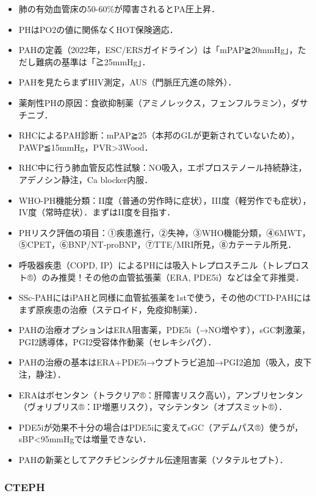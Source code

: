 \begin{itemize}
\item 肺の有効血管床の50-60\%が障害されるとPA圧上昇．
\item PHはPO2の値に関係なくHOT保険適応．
\item PAHの定義（2022年，ESC/ERSガイドライン）は「mPAP≧20mmHg」，ただし難病の基準は「≧25mmHg」．
\item PAHを見たらまずHIV測定，AUS（門脈圧亢進の除外）．
\item 薬剤性PHの原因：食欲抑制薬（アミノレックス，フェンフルラミン），ダサチニブ．
\item RHCによるPAH診断：mPAP≧25（本邦のGLが更新されていないため），PAWP≦15mmHg，PVR>3Wood．
\item RHC中に行う肺血管反応性試験：NO吸入，エポプロステノール持続静注，アデノシン静注，Ca blocker内服．
\item WHO-PH機能分類：II度（普通の労作時に症状），III度（軽労作でも症状），IV度（常時症状）．まずはII度を目指す．
\item PHリスク評価の項目：①疾患進行，②失神，③WHO機能分類，④6MWT，⑤CPET，⑥BNP/NT-proBNP，⑦TTE/MRI所見，⑧カテーテル所見．


\item 呼吸器疾患（COPD, IP）によるPHには吸入トレプロスチニル（トレプロスト®）のみ推奨！その他の血管拡張薬（ERA, PDE5i）などは全て非推奨．
\item SSc-PAHにはiPAHと同様に血管拡張薬を1stで使う，その他のCTD-PAHにはまず原疾患の治療（ステロイド，免疫抑制薬）．
\item PAHの治療オプションはERA阻害薬，PDE5i（→NO増やす），sGC刺激薬，PGI2誘導体，PGI2受容体作動薬（セレキシパグ）．
\item PAHの治療の基本はERA+PDE5i→ウプトラビ追加→PGI2追加（吸入，皮下注，静注）．
\item ERAはボセンタン（トラクリア®：肝障害リスク高い），アンブリセンタン（ヴォリブリス®：IP増悪リスク），マシテンタン（オプスミット®）．
\item PDE5iが効果不十分の場合はPDE5iに変えてsGC（アデムパス®）使うが，sBP<95mmHgでは増量できない．
\item PAHの新薬としてアクチビンシグナル伝達阻害薬（ソタテルセプト）．
\end{itemize}

\subsubsection{CTEPH}

